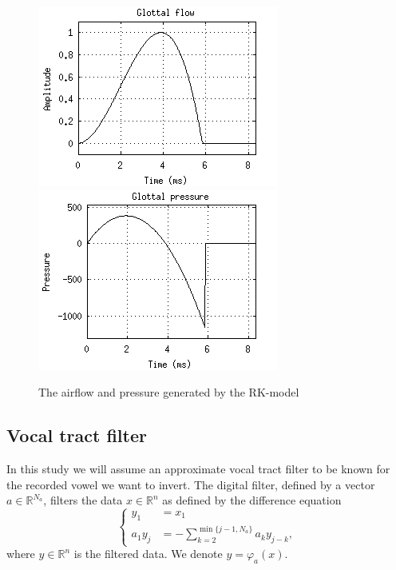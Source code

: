 \documentclass[12pt,a4]{article}
\newcommand{\R}{{\mathbb R}}
\begin{document}
\begin{figure}[t]
\begin{center}
\includegraphics[scale=1]{img/klattflow.png}
\includegraphics[scale=1]{img/klattpres.png}
\end{center}
\caption{The airflow and pressure generated by the RK-model}
\label{fig:klatt}
\end{figure}


\subsection{Vocal tract filter}
\label{sec:filter}

In this study we will assume an approximate vocal tract filter to be known for the recorded vowel we want to invert. The digital filter, defined by a vector $a \in \R^{N_a}$, filters the data $x \in \R^n$ as defined by the difference equation
\begin{equation}
\left\{
\begin{alignedat}{1}
\label{eq:filter-diffeq}
y_1     &= x_1 \\
a_1 y_j &= -\sum_{k=2}^{\min\{j-1, N_a\}} a_{k} y_{j-k} ,
\end{alignedat}
\right.
\end{equation}
where $y \in \R^n$ is the filtered data. We denote $y = \varphi_a (x)$.
\end{document}
